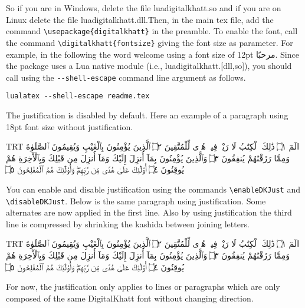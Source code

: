 \documentclass{article}
\newcommand{\DigitalKhatt}{DigitalKhatt}
\begin{document}
So if you are in Windows, delete the file luadigitalkhatt.so and if you are on Linux delete the file luadigitalkhatt.dll.Then, in the main tex file, add the command \verb!\usepackage{digitalkhatt}! in the preamble.
To enable the font, call the command \verb!\digitalkhatt{fontsize}! giving the font size as parameter. For example, in the following the word welcome using a font size of 12pt {\digitalkhatt{12pt}مرحبًا}.
Since the package uses a Lua native module (i.e., luadigitalkhatt.[dll,so]), you should call \LuaLaTeX{} using the \verb!--shell-escape! command line argument as follows.
\begin{verbatim}
lualatex --shell-escape readme.tex
\end{verbatim}
The justification is disabled by default. Here an example of a paragraph using 18pt font size without justification.\par
{\digitalkhatt{18pt}\selectfont\pardir TRT
الٓمٓ ۝١ ذَٰلِكَ ٱلْكِتَٰبُ لَا رَيْبَۛ فِيهِۛ هُدࣰى
لِّلْمُتَّقِينَ ۝٢ ٱلَّذِينَ يُؤْمِنُونَ بِٱلْغَيْبِ وَيُقِيمُونَ ٱلصَّلَوٰةَ
وَمِمَّا رَزَقْنَٰهُمْ يُنفِقُونَ ۝٣ وَٱلَّذِينَ يُؤْمِنُونَ بِمَآ أُنزِلَ
إِلَيْكَ وَمَآ أُنزِلَ مِن قَبْلِكَ وَبِٱلْأٓخِرَةِ هُمْ يُوقِنُونَ ۝٤
أُو۟لَٰٓئِكَ عَلَىٰ هُدࣰى مِّن رَّبِّهِمْۖ وَأُو۟لَٰٓئِكَ
هُمُ ٱلْمُفْلِحُونَ ۝٥
\par}
You can enable and disable justification using the commands \verb!\enableDKJust! and \verb!\disableDKJust!. Below is the same paragraph using justification.
Some alternates are now applied in the first line. Also by using justification the third line is compressed by shrinking the kashida between joining letters.\par
{\digitalkhatt{18pt}\enableDKJust\pardir TRT
الٓمٓ ۝١ ذَٰلِكَ ٱلْكِتَٰبُ لَا رَيْبَۛ فِيهِۛ هُدࣰى
لِّلْمُتَّقِينَ ۝٢ ٱلَّذِينَ يُؤْمِنُونَ بِٱلْغَيْبِ وَيُقِيمُونَ ٱلصَّلَوٰةَ
وَمِمَّا رَزَقْنَٰهُمْ يُنفِقُونَ ۝٣ وَٱلَّذِينَ يُؤْمِنُونَ بِمَآ أُنزِلَ
إِلَيْكَ وَمَآ أُنزِلَ مِن قَبْلِكَ وَبِٱلْأٓخِرَةِ هُمْ يُوقِنُونَ ۝٤
أُو۟لَٰٓئِكَ عَلَىٰ هُدࣰى مِّن رَّبِّهِمْۖ وَأُو۟لَٰٓئِكَ
هُمُ ٱلْمُفْلِحُونَ ۝٥
\par}

For now, the justification only applies to lines or paragraphs which are only composed of the same \DigitalKhatt{} font without changing direction.
\end{document}
